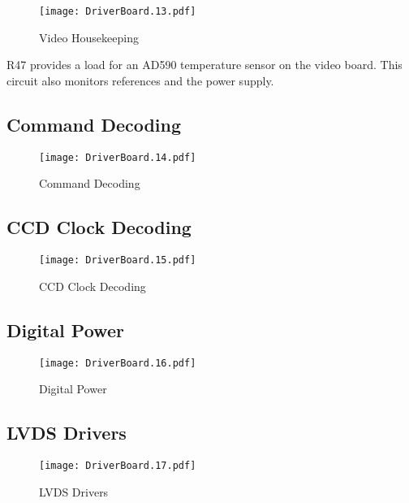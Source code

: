 \documentclass[a4paper,12pt]{article}
\begin{document}
   \begin{figure}
   \begin{center}
   \texttt{[image: DriverBoard.13.pdf]}
   \end{center}
   \caption{Video Housekeeping}
   \end{figure}


R47 provides a load for an AD590 temperature sensor on the video board. This circuit also monitors references and the power supply.

\subsection{Command Decoding}
   \begin{figure}
   \begin{center}
   \texttt{[image: DriverBoard.14.pdf]}
   \end{center}
   \caption{Command Decoding}
   \end{figure}

\subsection{CCD Clock Decoding}
   \begin{figure}
   \begin{center}
   \texttt{[image: DriverBoard.15.pdf]}
   \end{center}
   \caption{CCD Clock Decoding}
   \end{figure}

\subsection{Digital Power}
   \begin{figure}
   \begin{center}
   \texttt{[image: DriverBoard.16.pdf]}
   \end{center}
   \caption{Digital Power}
   \end{figure}

\subsection{LVDS Drivers}
   \begin{figure}
   \begin{center}
   \texttt{[image: DriverBoard.17.pdf]}
   \end{center}
   \caption{LVDS Drivers}
   \end{figure}
\end{document}

